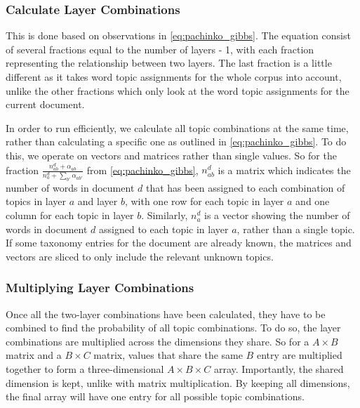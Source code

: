 \subsubsection{Calculate Layer Combinations}\label{app:calculate_layer_combs}
This is done based on observations in \autoref{eq:pachinko_gibbs}.
The equation consist of several fractions equal to the number of layers - 1, with each fraction representing the relationship between two layers.
The last fraction is a little different as it takes word topic assignments for the whole corpus into account, unlike the other fractions which only look at the word topic assignments for the current document.

In order to run efficiently, we calculate all topic combinations at the same time, rather than calculating a specific one as outlined in \autoref{eq:pachinko_gibbs}.
To do this, we operate on vectors and matrices rather than single values.
So for the fraction $\frac{n_{ab}^d + \alpha_{ab}}{n_a^d + \sum_{b'} \alpha_{ab'}}$ from \autoref{eq:pachinko_gibbs}, $n_{ab}^d$ is a matrix which indicates the number of words in document $d$ that has been assigned to each combination of topics in layer $a$ and layer $b$, with one row for each topic in layer $a$ and one column for each topic in layer $b$.
Similarly, $n_a^d$ is a vector showing the number of words in document $d$ assigned to each topic in layer $a$, rather than a single topic.
If some taxonomy entries for the document are already known, the matrices and vectors are sliced to only include the relevant unknown topics.

\subsubsection{Multiplying Layer Combinations}
Once all the two-layer combinations have been calculated, they have to be combined to find the probability of all topic combinations.
To do so, the layer combinations are multiplied across the dimensions they share.
So for a $A\times B$ matrix and a $B\times C$ matrix, values that share the same $B$ entry are multiplied together to form a three-dimensional $A\times B\times C$ array.
Importantly, the shared dimension is kept, unlike with matrix multiplication.
By keeping all dimensions, the final array will have one entry for all possible topic combinations.
